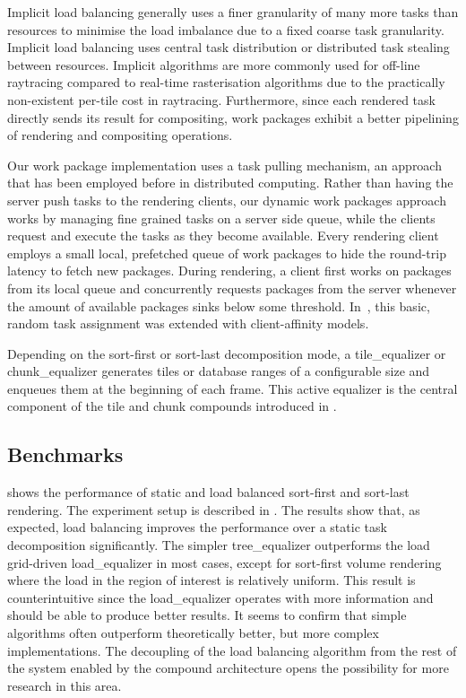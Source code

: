 Implicit load balancing generally uses a finer granularity of many more tasks
than resources to minimise the load imbalance due to a fixed coarse task
granularity. Implicit load balancing uses central task distribution or
distributed task stealing between resources. Implicit algorithms are more
commonly used for off-line raytracing compared to real-time rasterisation
algorithms due to the practically non-existent per-tile cost in raytracing.
Furthermore, since each rendered task directly sends its result for
compositing, work packages exhibit a better pipelining of rendering and
compositing operations.

Our work package implementation uses a task pulling mechanism, an approach that
has been employed before in distributed computing. Rather than having the
server push tasks to the rendering clients, our dynamic work packages approach
works by managing fine grained tasks on a server side queue, while the clients
request and execute the tasks as they become available. Every rendering client
employs a small local, prefetched queue of work packages to hide the round-trip
latency to fetch new packages. During rendering, a client first works on
packages from its local queue and concurrently requests packages from the
server whenever the amount of available packages sinks below some threshold.
In~\cite{SPEP:16}, this basic, random task assignment was extended with
client-affinity models.

Depending on the sort-first or sort-last decomposition mode, a
\textsf{tile\_equalizer} or \textsf{chunk\_equalizer} generates tiles or
database ranges of a configurable size and enqueues them at the beginning of
each frame. This active equalizer is the central component of the tile and chunk
compounds introduced in .


\subsection{Benchmarks}

 shows the performance of static and load balanced sort-first
and sort-last rendering. The experiment setup is described in \cite{ESP:18}.
The results show that, as expected, load balancing improves the performance
over a static task decomposition significantly. The simpler
\textsf{tree\_equalizer} outperforms the load grid-driven
\textsf{load\_equalizer} in most cases, except for sort-first volume rendering
where the load in the region of interest is relatively uniform. This result is
counterintuitive since the \textsf{load\_equalizer} operates with more
information and should be able to produce better results. It seems to confirm
that simple algorithms often outperform theoretically better, but more complex
implementations. The decoupling of the load balancing algorithm from the rest
of the system enabled by the compound architecture opens the possibility for
more research in this area.


